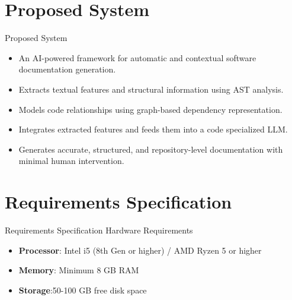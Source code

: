 \documentclass{beamer}
\begin{document}
\section{Proposed System}

\begin{frame}{Proposed System}
\begin{itemize}
\justifying
\item An AI-powered framework for automatic and contextual software documentation generation.
\item Extracts textual features and structural information using AST analysis.
\item Models code relationships using graph-based dependency representation.
\item Integrates extracted features and feeds them into a code specialized LLM.
\item Generates accurate, structured, and repository-level documentation with minimal human intervention.
\end{itemize}
\end{frame}




\section{Requirements Specification}
\begin{frame}{Requirements Specification}
    Hardware Requirements
    \begin{itemize}
    \justifying
    \item \textbf{Processor}: Intel i5 (8th Gen or higher) / AMD Ryzen 5 or higher
    \item \textbf{Memory}: Minimum 8 GB RAM
    \item \textbf{Storage}:50-100 GB free disk space
    

\end{itemize}
\end{frame}
\end{document}
